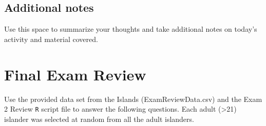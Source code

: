 \documentclass[
]{report}
\begin{document}
\hypertarget{additional-notes-21}{%
\subsection{Additional notes}\label{additional-notes-21}}

Use this space to summarize your thoughts and take additional notes on today's activity and material covered.

\newpage

\hypertarget{final-exam-review}{%
\section{Final Exam Review}\label{final-exam-review}}


Use the provided data set from the Islands (ExamReviewData.csv) and the Exam 2 Review \texttt{R} script file to answer the following questions. Each adult (\textgreater21) islander was selected at random from all the adult islanders.
\end{document}
